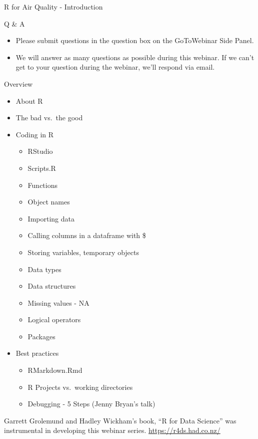 \documentclass[ignorenonframetext,]{beamer}
\date{}
\providecommand{\tightlist}{%
  \setlength{\itemsep}{0pt}\setlength{\parskip}{0pt}}
\begin{document}
\begin{frame}{R for Air Quality - Introduction}

\end{frame}

\begin{frame}{Q \& A }

\begin{itemize}
\tightlist
\item
  Please submit questions in the question box on the GoToWebinar Side
  Panel.
\item
  We will answer as many questions as possible during this webinar. If
  we can't get to your question during the webinar, we'll respond via
  email.
\end{itemize}

\end{frame}

\begin{frame}{Overview}

\begin{itemize}
\tightlist
\item
  About R
\item
  The bad vs.~the good
\item
  Coding in R

  \begin{itemize}
  \tightlist
  \item
    RStudio
  \item
    Scripts.R
  \item
    Functions
  \item
    Object names
  \item
    Importing data
  \item
    Calling columns in a dataframe with \$
  \item
    Storing variables, temporary objects
  \item
    Data types
  \item
    Data structures
  \item
    Missing values - NA
  \item
    Logical operators
  \item
    Packages
  \end{itemize}
\item
  Best practices

  \begin{itemize}
  \tightlist
  \item
    RMarkdown.Rmd
  \item
    R Projects vs.~working directories
  \item
    Debugging - 5 Steps (Jenny Bryan's talk)
  \end{itemize}
\end{itemize}

Garrett Grolemund and Hadley Wickham's book, ``R for Data Science'' was
instrumental in developing this webinar series.
\url{https://r4ds.had.co.nz/}

\end{frame}
\end{document}
